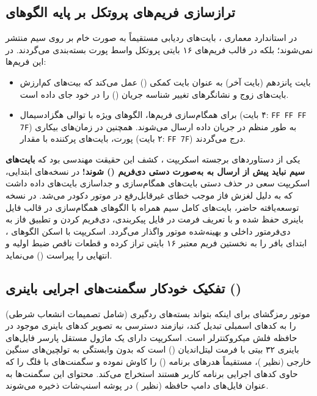 \subsection{ترازسازی فریم‌های پروتکل  بر پایه الگوهای }
در استاندارد معماری ، بایت‌های ردیابی مستقیماً به صورت خام بر روی سیم منتشر نمی‌شوند؛ بلکه در قالب فریم‌های ۱۶ بایتی پروتکل واسط پورت  بسته‌بندی می‌گردند. در این فریم‌ها:
\begin{itemize}
    \item بایت پانزدهم (بایت آخر) به عنوان بایت کمکی () عمل می‌کند که بیت‌های کم‌ارزش بایت‌های زوج و نشانگرهای تغییر شناسه جریان () را در خود جای داده است.
    \item برای همگام‌سازی فریم‌ها، الگوهای ویژه  با توالی هگزادسیمال  (۴ بایت: \texttt{FF FF FF 7F}) به طور منظم در جریان داده ارسال می‌شوند. همچنین در زمان‌های بیکاری پورت، بایت‌های پرکننده  با مقدار  (۲ بایت: \texttt{FF 7F}) درج می‌گردند.
\end{itemize}

یکی از دستاوردهای برجسته اسکریپت ، کشف این حقیقت مهندسی بود که \textbf{بایت‌های سیم نباید پیش از ارسال به  به‌صورت دستی دی‌فریم () شوند!} در نسخه‌های ابتدایی، اسکریپت سعی در حذف دستی بایت‌های همگام‌سازی و جداسازی بایت‌های داده داشت که به دلیل لغزش فاز موجب خطای غیرقابل‌رفع  در موتور دکودر می‌شد. در نسخه توسعه‌یافته حاضر، بایت‌های کامل سیم همراه با الگوهای همگام‌سازی در قالب فایل باینری  حفظ شده و با تعریف فرمت  در فایل پیکربندی، دی‌فریم کردن و تطبیق فاز به دی‌فرمتور داخلی و بهینه‌شده موتور  واگذار می‌گردد. اسکریپت با اسکن الگوهای ، ابتدای بافر را به نخستین فریم معتبر ۱۶ بایتی تراز کرده و قطعات ناقص ضبط اولیه و انتهایی را پیراست () می‌نماید.

\subsection{تفکیک خودکار سگمنت‌های اجرایی باینری ()}
موتور رمزگشای  برای اینکه بتواند بسته‌های ردگیری (شامل تصمیمات انشعاب شرطی) را به کدهای اسمبلی تبدیل کند، نیازمند دسترسی به تصویر کدهای باینری موجود در حافظه فلش میکروکنترلر است. اسکریپت  دارای یک ماژول مستقل پارسر فایل‌های باینری  ۳۲ بیتی با فرمت لیتل‌اندیان () است که بدون وابستگی به تولچین‌های سنگین خارجی (نظیر )، مستقیماً هدرهای برنامه () را کاوش نموده و سگمنت‌های با فلگ  را که حاوی کدهای اجرایی برنامه کاربر هستند استخراج می‌کند. محتوای این سگمنت‌ها به عنوان فایل‌های دامپ حافظه (نظیر ) در پوشه اسنپ‌شات ذخیره می‌شوند.

